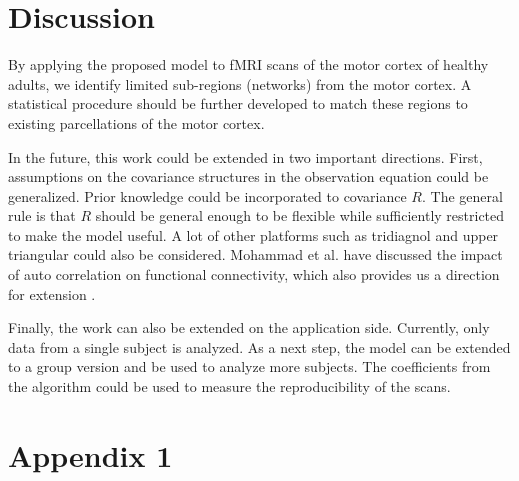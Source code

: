 \documentclass[fleqn]{article}
\begin{document}
%
%
%
\section{Discussion}
By applying the proposed model to fMRI scans of the motor cortex of healthy adults, we identify limited sub-regions (networks) from the motor cortex. A statistical procedure should be further developed to match these regions to existing parcellations of the motor cortex.

In the future, this work could be extended in two important directions. First, assumptions on the covariance structures in the observation equation could be generalized. Prior knowledge could be incorporated to covariance $R$. The general rule is that $R$ should be general enough to be flexible while sufficiently restricted to make the model useful. A lot of other platforms such as tridiagnol and upper triangular could also be considered. Mohammad et al. have discussed the impact of auto correlation on functional connectivity, which also provides us a direction for extension \cite{arbabshirani2014impact}.

Finally, the work can also be extended on the application side. Currently, only data from a single subject is analyzed. As a next step, the model can be extended to a group version and be used to analyze more subjects. The coefficients from the algorithm could be used to measure the reproducibility of the scans.

\section*{Appendix 1}
\label{sec:appendix1}
\end{document}
